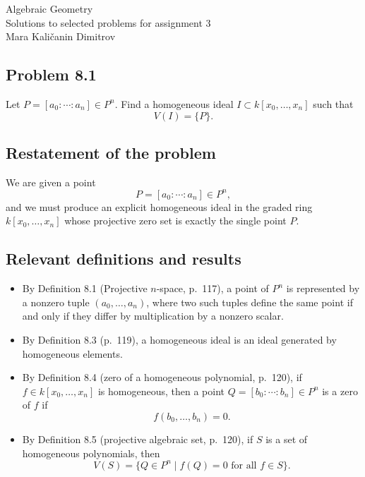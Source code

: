 \documentclass[a4paper,12pt,openany]{article}
\theoremstyle{plain}
\theoremstyle{definition}
\theoremstyle{remark}
\begin{document}
\begin{center}
\huge Algebraic Geometry\\
\vspace{0.2cm}
\Large Solutions to selected problems for assignment 3 \\  \vspace{0.5cm}
Mara Kali\v{c}anin Dimitrov
\vspace{0.5cm}
\end{center}



\subsection*{Problem 8.1}

Let $P=[a_0:\cdots:a_n]\in P^n$. Find a homogeneous ideal $I\subset k[x_0,\dots,x_n]$
such that
\[
V(I)=\{P\}.
\]

\subsection*{Restatement of the problem}

We are given a point
\[
P=[a_0:\cdots:a_n]\in P^n,
\]
and we must produce an explicit homogeneous ideal in the graded ring
$k[x_0,\dots,x_n]$ whose projective zero set is exactly the single point $P$.

\subsection*{Relevant definitions and results}

\begin{itemize}
    \item By Definition 8.1 (Projective $n$-space, p.~117), a point of $P^n$ is represented
    by a nonzero tuple $(a_0,\dots,a_n)$, where two such tuples define the same point if
    and only if they differ by multiplication by a nonzero scalar.

    \item By Definition 8.3 (p.~119), a homogeneous ideal is an ideal generated by
    homogeneous elements.

    \item By Definition 8.4 (zero of a homogeneous polynomial, p.~120), if
    $f\in k[x_0,\dots,x_n]$ is homogeneous, then a point
    $Q=[b_0:\cdots:b_n]\in P^n$ is a zero of $f$ if
    \[
    f(b_0,\dots,b_n)=0.
    \]

    \item By Definition 8.5 (projective algebraic set, p.~120), if $S$ is a set of
    homogeneous polynomials, then
    \[
    V(S)=\{Q\in P^n \mid f(Q)=0 \text{ for all } f\in S\}.
    \]
\end{itemize}
\end{document}
